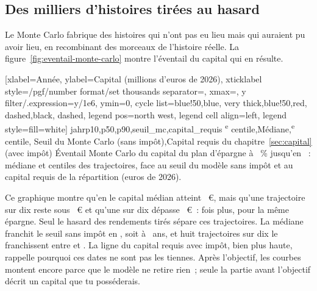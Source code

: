 \subsection{Des milliers d'histoires tir\'ees au hasard}\label{sec:risques-montecarlo}

Le Monte Carlo fabrique des histoires qui n'ont pas eu lieu mais qui auraient pu avoir lieu, en
recombinant des morceaux de l'histoire r\'eelle. La figure~\ref{fig:eventail-monte-carlo} montre
l'\'eventail du capital qui en r\'esulte.


[xlabel={Ann\'ee}, ylabel={Capital (millions d'euros de 2026)},
  xticklabel style={/pgf/number format/set thousands separator={}}, xmax=\AnneeHorizonFin,
  y filter/.expression={y/1e6}, ymin=0,
  cycle list={{blue!50},{blue, very thick},{blue!50},{red, dashed},{black, dashed}},
  legend pos=north west, legend cell align=left, legend style={fill=white}]%
  {jahr}{p10,p50,p90,seuil_mc,capital_requis}%
  {{\McCentileBas\textsuperscript{e} centile},{M\'ediane},{\McCentileHaut\textsuperscript{e} centile},
   {Seuil du Monte Carlo (sans imp\^ot)},{Capital requis du chapitre~\ref{sec:capital} (avec imp\^ot)}}%
  {\'Eventail Monte Carlo du capital du plan d'\'epargne \`a \ReferenzSparquote~\% jusqu'en
  \AnneeHorizonFin~: m\'ediane et centiles des \McTrajectoires{} trajectoires, face au seuil du mod\`ele
  sans imp\^ot et au capital requis de la r\'epartition \ReferenzStrategie{} (euros de
  2026).\label{fig:eventail-monte-carlo}}

Ce graphique montre qu'en \AnneeHorizonFin{} le capital m\'edian atteint \McCapitalHorizonMedian~€,
mais qu'une trajectoire sur dix reste sous \McCapitalHorizonBas~€ et qu'une sur dix d\'epasse
\McCapitalHorizonHaut~€~: \McEventailRapport{} fois plus, pour la m\^eme \'epargne. Seul le hasard des
rendements tir\'es s\'epare ces trajectoires. La m\'ediane franchit le seuil sans imp\^ot en
\McAnneeObjectifMedian, soit \`a \McAgeObjectifMedian~ans, et huit trajectoires sur dix le franchissent
entre \McAnneeObjectifBas{} et \McAnneeObjectifHaut. La ligne du capital requis avec imp\^ot, bien plus
haute, rappelle pourquoi ces dates ne sont pas les tiennes. Apr\`es l'objectif, les courbes montent
encore parce que le mod\`ele ne retire rien~; seule la partie avant l'objectif d\'ecrit un capital que
tu poss\'ederais.

